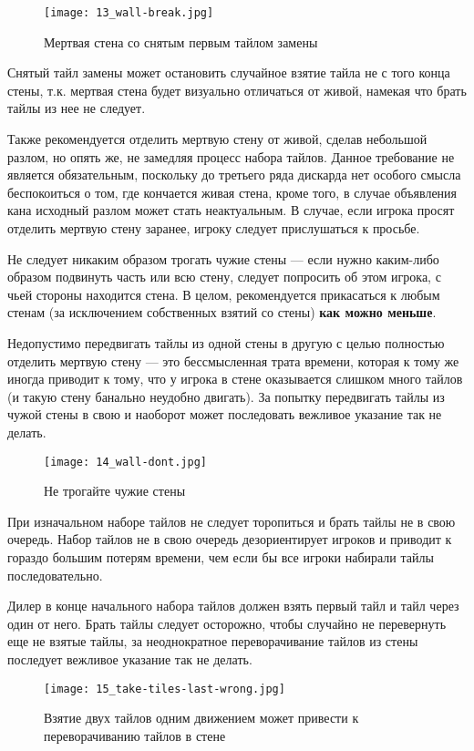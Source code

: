 \begin{figure}[H]
	\centering
	\texttt{[image: 13\_wall-break.jpg]}
	\caption{Мертвая стена со снятым первым тайлом замены}
\end{figure}

Снятый тайл замены может остановить случайное взятие тайла не с того конца стены, т.к. мертвая стена будет визуально отличаться от живой, намекая что брать тайлы из нее не следует. 

Также рекомендуется отделить мертвую стену от живой, сделав небольшой разлом, но опять же, не замедляя процесс набора тайлов. Данное требование не является обязательным, поскольку до третьего ряда дискарда нет особого смысла беспокоиться о том, где кончается живая стена, кроме того, в случае объявления кана исходный разлом может стать неактуальным. В случае, если игрока просят отделить мертвую стену заранее, игроку следует прислушаться к просьбе.

Не следует никаким образом трогать чужие стены --- если нужно каким-либо образом подвинуть часть или всю стену, следует попросить об этом игрока, с чьей стороны находится стена. В целом, рекомендуется прикасаться к любым стенам (за исключением собственных взятий со стены) \textbf{как можно меньше}.

Недопустимо передвигать тайлы из одной стены в другую с целью полностью отделить мертвую стену --- это бессмысленная трата времени, которая к тому же иногда приводит к тому, что у игрока в стене оказывается слишком много тайлов (и такую стену банально неудобно двигать). За попытку передвигать тайлы из чужой стены в свою и наоборот может последовать вежливое указание так не делать.

\begin{figure}[H]
	\centering
	\texttt{[image: 14\_wall-dont.jpg]}
	\caption{Не трогайте чужие стены}
\end{figure}

При изначальном наборе тайлов не следует торопиться и брать тайлы не в свою очередь. Набор тайлов не в свою очередь дезориентирует игроков и приводит к гораздо большим потерям времени, чем если бы все игроки набирали тайлы последовательно.

Дилер в конце начального набора тайлов должен взять первый тайл и тайл через один от него. Брать тайлы следует осторожно, чтобы случайно не перевернуть еще не взятые тайлы, за неоднократное переворачивание тайлов из стены последует вежливое указание так не делать.

\begin{figure}[H]
	\centering
	\texttt{[image: 15\_take-tiles-last-wrong.jpg]}
	\caption{Взятие двух тайлов одним движением может привести к переворачиванию тайлов в стене}
\end{figure}

